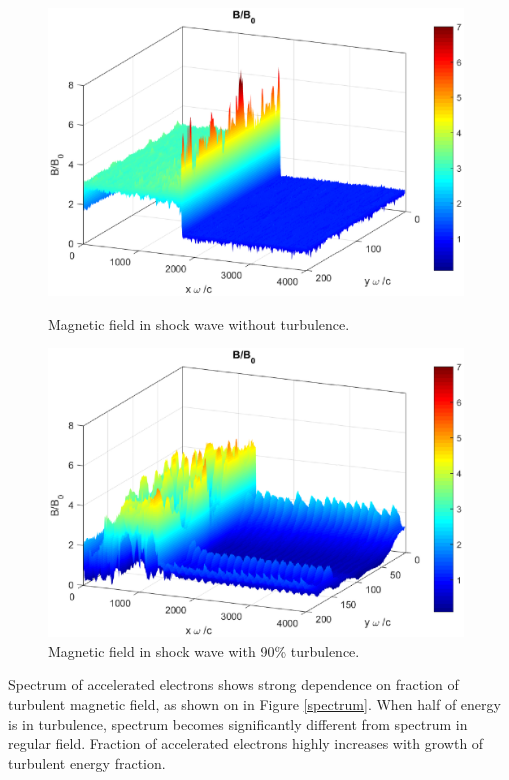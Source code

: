 \documentclass[a4paper]{jpconf}
\begin{document}
\begin{figure}[h!]
	\centering
	\begin{minipage}{0.49\textwidth}
		\centering
		\includegraphics[width=0.98\textwidth]{fig/regular_field.eps} 
		\caption{Magnetic field in shock wave without turbulence.}
		\label{regularB}
	\end{minipage}\hfill
	\begin{minipage}{0.49\textwidth}
		\centering
		\includegraphics[width=0.98\textwidth]{fig/turbulent_field.eps} 
		\caption{Magnetic field in shock wave with 90\% turbulence.}
		\label{turbulentB}
	\end{minipage}
\end{figure}
Spectrum of accelerated electrons shows strong dependence on fraction of turbulent magnetic field, as shown on in Figure \ref{spectrum}. When half of energy is in turbulence, spectrum becomes significantly different from spectrum in regular field. Fraction of accelerated electrons highly increases with growth of turbulent energy fraction. 
\end{document}
